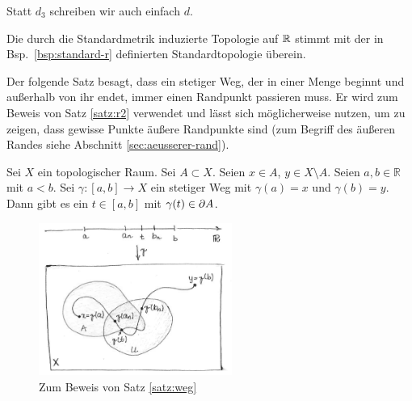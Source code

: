     \begin{konv}\label{konv:d3}
        Statt $d_3$ schreiben wir auch einfach $d$.	
    \end{konv}
    
    \begin{bem}
        Die durch die Standardmetrik induzierte Topologie auf $\mathbb{R}$ stimmt mit der in Bsp.~\ref{bsp:standard-r} definierten Standardtopologie überein.
    \end{bem}


    Der folgende Satz besagt, dass ein stetiger Weg, der in einer Menge beginnt und außerhalb von ihr endet, immer einen Randpunkt passieren muss. Er wird zum Beweis von Satz \ref{satz:r2} verwendet und lässt sich möglicherweise nutzen, um zu zeigen, dass gewisse Punkte äußere Randpunkte sind (zum Begriff des äußeren Randes siehe Abschnitt \ref{sec:aeusserer-rand}).
    \begin{satz}\label{satz:weg} %
        Sei $X$ ein topologischer Raum. Sei $A \subset X$. Seien $x \in A$, $y \in X \setminus A$. Seien $a,b \in \mathbb{R}$ mit $a < b$. Sei $\gamma : [a,b] \to X$ ein stetiger Weg mit $\gamma(a) = x$ und $\gamma(b) = y$. Dann gibt es ein $t \in [a,b]$ mit $\gamma(t) \in \partial A$.
    \end{satz}
    
    \begin{figure}[ht]
        \centering
        \includegraphics[height=5cm]{gfx/weg_sw.png}
        \caption{Zum Beweis von Satz \ref{satz:weg}}
        \label{fig:weg}
    \end{figure}

